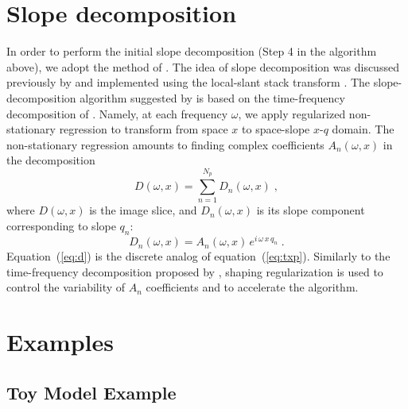 
\section{Slope decomposition}
In order to perform the initial slope decomposition (Step 4 in the
algorithm above), we adopt the method of \cite{ghosh}. The idea of slope
decomposition was discussed previously by \cite {Ottolini.sep.37.143} and
implemented using the local-slant stack
transform \cite[]{ventosa}. The slope-decompo\-sition algorithm
suggested by \cite {ghosh} is based on the time-frequency
decomposition of \cite{liu2013}. Namely, at each frequency $\omega$,
we apply regularized non-stationary regression \cite[]{lpf} to
transform from space $x$ to space-slope $x$-$q$ domain. The
non-stationary regression amounts to finding complex coefficients
$A_n(\omega,x)$ in the decomposition
\begin{equation}
D(\omega,x) = \sum\limits_{n=1}^{N_p} D_n(\omega,x)\;,
\label{eq:d}
\end{equation}
where $D(\omega,x)$ is the image slice, and $D_n(\omega,x)$ is its slope component corresponding to slope $q_n$:
\begin{equation}
\label{eq:dn}
D_n(\omega,x) =  A_n(\omega,x)\,e^{i\,\omega\,x\,q_n}\;.
\end{equation}
Equation~(\ref{eq:d}) is the discrete analog of
equation~(\ref{eq:txp}). Similarly to the time-frequency
decomposition proposed by \cite{liu2013}, shaping
regularization is used to control the variability of
$A_n$ coefficients and to accelerate the algorithm. 

\section{Examples}
\subsection{Toy Model Example}

